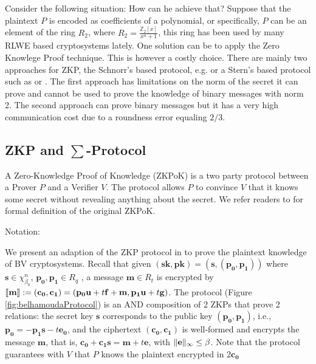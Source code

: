 Consider the following situation:  How can he achieve that?
Suppose that the plaintext \(P\) is encoded as coefficients of a polynomial, or
specifically, \(P\) can be an element of the ring \(R_{2}\), where
\(R_{2} = \frac{\mathbb{Z}_{2}[x]}{x^{n} + 1}\), this ring has been used by many
RLWE based cryptosystems lately. One solution can be to apply the Zero Knowlege
Proof technique. This is however a costly choice. There are mainly two
approaches for ZKP, the Schnorr's based protocol,
e.g. \cite{benhamouda2014better} or a Stern's based protocol such as
\cite{stern1993new} or \cite{ling2013improved}. The first approach has
limitations on the norm of the secret it can prove and cannot be used to prove
the knowledge of binary messages with norm 2. The second approach can prove
binary messages but it has a very high communication cost due to a roundness
error equaling \(2/3\).
\subsection{ZKP and $\sum$-Protocol}
\label{sub:zkp_and_sum_protocol}
A Zero-Knowledge Proof of Knowledge (ZKPoK) is a two party protocol between a
Prover $P$ and a Verifier $V$. The protocol allows $P$ to convince $V$ that it
knows some secret without revealing anything about the secret. We refer readers
to \cite{bellare1992defining} for formal definition of the original ZKPoK. 

Notation: 



We present an adaption of the ZKP protocol in \cite{benhamouda2014better} to
prove the plaintext knowledge of BV cryptosystems. Recall that given
$\mathbf{(sk,pk) = (s,(p_0,p_1))}$ where $\mathbf{s} \in \chi_{\beta_0}^n$,
$\mathbf{p_0,p_1} \in R_q$ , a message $\mathbf{m} \in R_t$ is encrypted by
$\left\llbracket\mathbf{m}\right\rrbracket := \mathbf{(c_0, c_1)} = (\mathbf{p_0u} + t\mathbf{f + m,
  p_1u} + t\mathbf{g)}$. The protocol (Figure \ref{fig:belhamoudaProtocol}) is
an AND composition of 2 ZKPs that prove 2 relations: the secret key $\mathbf{s}$
corresponds to the public key $\mathbf{(p_0,p_1)}$, i.e.,
$\mathbf{p_0 = -p_1s} - t\mathbf{e_0}$, and the ciphertext $\mathbf{(c_0,c_1)}$
is well-formed and encrypts the message $\mathbf{m}$, that is,
$\mathbf{c_0 + c_1s} = \mathbf{m} + t\mathbf{e}$, with
$\Vert \mathbf{e} \Vert_{\infty} \leq \beta$. Note that the protocol guarantees with $V$
that $P$ knows the plaintext encrypted in $2\mathbf{c_0}$

